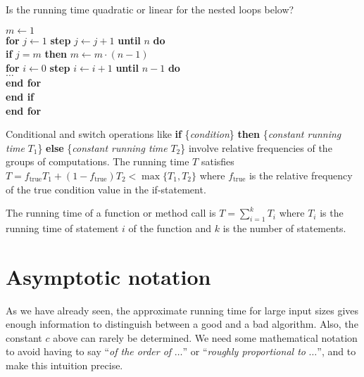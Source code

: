 \begin{Boxample}[6]
\label{exm:nest1}
Is the running time quadratic or linear for the nested loops below?\\

\begin{minipage}{5in}
\Algorbody
{
\(m \leftarrow 1\) \\
\textbf{for} \(j \leftarrow 1\) \textbf{step} \(j \leftarrow j+1\) 
                                    \textbf{until} \(n\) \textbf{do}\\
\>\textbf{if} \(j = m \) \textbf{then} \(m \leftarrow m \cdot (n-1)\) \\
\>\>\textbf{for} \(i \leftarrow  0\) \textbf{step} \(i \leftarrow i+1\) 
                                       \textbf{until} \(n-1\) \textbf{do}\\
\>\>\>$\ldots$  \\
\>\>\textbf{end for} \\
\>\textbf{end if}\\
\textbf{end for} \\
}
\end{minipage}

\end{Boxample}


Conditional and switch operations like \textbf{if}
\{\emph{condition}\} \textbf{then} \{\emph{constant running time}
$T_1$\} \textbf{else} \{\emph{constant running time} $T_2$\} involve
relative frequencies of the groups of computations.  The running time
$T$ satisfies $T = f_\mathrm{true} T_1 + (1 - f_\mathrm{true}) T_2 <
\max \{ T_1, T_2 \}$ where $f_\mathrm{true}$ is the relative frequency
of the true condition value in the if-statement.

The running time of a function or method call is $T = \sum_{i=1}^{k}T_i$
where $T_i$ is the running time of statement \(i\) of the function
and $k$ is the number of statements.


\chapter{Asymptotic notation} %



As we have already seen, the approximate running time for large input
sizes gives enough information to distinguish between a good and a bad
algorithm. Also, the constant $c$ above can rarely be determined. We
need some mathematical notation to avoid having to say ``\emph{of the
order of} $\ldots$''  or ``\emph{roughly proportional to} $\ldots$'',
and to make this intuition precise.

